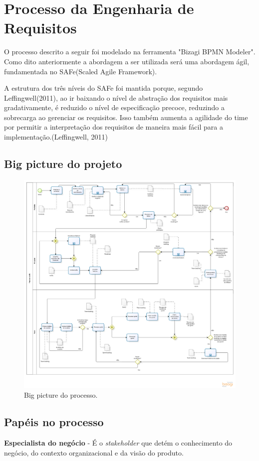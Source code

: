 \chapter[Processo da Engenharia de Requisitos]{Processo da Engenharia de Requisitos}
O processo descrito a seguir foi modelado na ferramenta "Bizagi BPMN Modeler". Como dito anteriormente a abordagem a ser utilizada será uma abordagem ágil, fundamentada no SAFe(Scaled Agile Framework).

A estrutura dos três níveis do SAFe foi mantida porque, segundo Leffingwell(2011), ao ir baixando o nível de abstração dos requisitos mais gradativamente, é reduzido o nível de especificação precoce, reduzindo a sobrecarga ao gerenciar os requisitos. Isso também aumenta a agilidade do time por permitir a interpretação dos requisitos de maneira mais fácil para a implementação.(Leffingwell, 2011)
\section{Big picture do projeto}
  \begin{figure}[!htbp]
    \centering
    \includegraphics[scale=0.3]{figuras/Processo_v1-2}
    \caption[Big picture do processo.]{Big picture do processo. \footnotemark}
    \label{processo}
  \end{figure}
\section{Papéis no processo}
\textbf{Especialista do negócio} - É o \textit{stakeholder} que detém o conhecimento do negócio, do contexto organizacional e da visão do produto.


